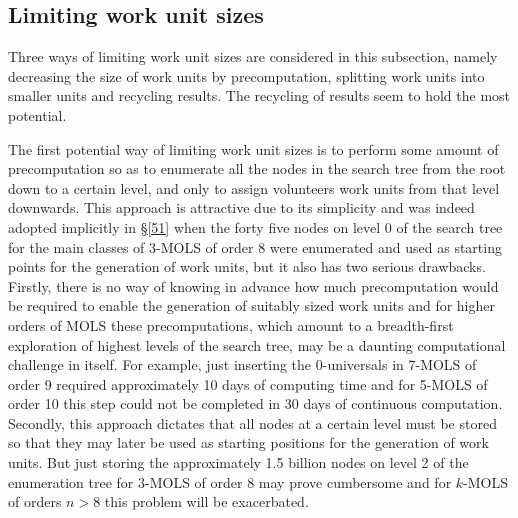 \subsection{Limiting work unit sizes} \label{5gensizes}
Three ways of limiting work unit sizes  are considered in this subsection, namely  decreasing the size of work units by precomputation, splitting work units into smaller units and recycling results. The recycling of results seem to hold the most potential.

The first potential way of limiting work unit sizes is to perform some amount of precomputation so as to enumerate all the nodes in the search tree from the root down to a certain level, and only to assign volunteers work units from that level downwards. 
This approach is attractive due to its simplicity and was indeed adopted implicitly in \S\ref{51} when the forty five nodes on level 0 of the search tree for the main classes of 3-MOLS of order 8 were enumerated and used as starting points for the generation of work units, but it also has two serious drawbacks. 
Firstly, there is no way of knowing in advance how much precomputation would be required to enable the generation of suitably sized work units and for higher orders of MOLS these precomputations, which amount to a breadth-first exploration of highest levels of the search tree, may be a daunting computational challenge in itself. For example, just inserting the 0-universals in 7-MOLS of order 9 required approximately 10 days of computing time and for 5-MOLS of order 10 this step could not be completed in 30 days of continuous computation. 
Secondly, this approach dictates that all nodes at a certain level must be stored so that they may later be used as starting positions for the generation of work units. But just storing the approximately 1.5 billion nodes on level 2 of the enumeration tree for 3-MOLS of order 8 may prove cumbersome and for $k$-MOLS of orders $n>8$ this problem will be exacerbated. %

